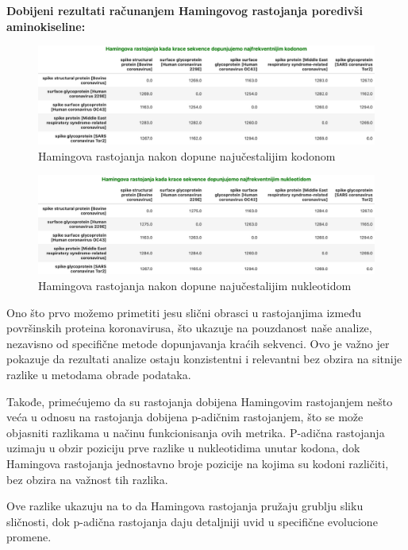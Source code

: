 \documentclass[a4paper,12pt]{article}
\begin{document}
\bigskip
\noindent
\textbf{Dobijeni rezultati računanjem Hamingovog rastojanja poredivši aminokiseline:}
\bigskip

\begin{figure}[h!]
  \centering
  \includegraphics[width=1.0\textwidth]{slika17.jpeg}
  \caption{Hamingova rastojanja nakon dopune najučestalijim kodonom}
  \label{fig:my_label}
\end{figure}

\begin{figure}[h!]
  \centering
  \includegraphics[width=1.0\textwidth]{slika18.jpeg}
  \caption{Hamingova rastojanja nakon dopune najučestalijim nukleotidom}
  \label{fig:my_label}
\end{figure}

\bigskip
Ono što prvo možemo primetiti jesu slični obrasci u rastojanjima između površinskih proteina koronavirusa, što ukazuje na pouzdanost naše analize, nezavisno od specifične metode dopunjavanja kraćih sekvenci. Ovo je važno jer pokazuje da rezultati analize ostaju konzistentni i relevantni bez obzira na sitnije razlike u metodama obrade podataka.

\medskip
Takođe, primećujemo da su rastojanja dobijena Hamingovim rastojanjem nešto veća u odnosu na rastojanja dobijena p-adičnim rastojanjem, što se može objasniti razlikama u načinu funkcionisanja ovih metrika. P-adična rastojanja uzimaju u obzir poziciju prve razlike u nukleotidima unutar kodona, dok Hamingova rastojanja jednostavno broje pozicije na kojima su kodoni različiti, bez obzira na važnost tih razlika. 

Ove razlike ukazuju na to da Hamingova rastojanja pružaju grublju sliku sličnosti, dok p-adična rastojanja daju detaljniji uvid u specifične evolucione promene.
\end{document}
